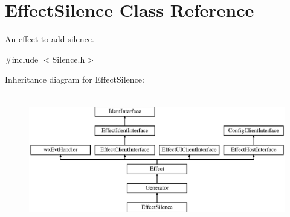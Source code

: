 \hypertarget{class_effect_silence}{}\section{Effect\+Silence Class Reference}
\label{class_effect_silence}


An effect to add silence.  




{\ttfamily \#include $<$Silence.\+h$>$}

Inheritance diagram for Effect\+Silence\+:\begin{figure}[H]
\begin{center}
\leavevmode
\includegraphics[height=5.753425cm]{class_effect_silence}
\end{center}
\end{figure}
